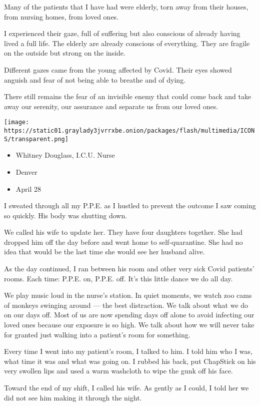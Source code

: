 Many of the patients that I have had were elderly, torn away from their
houses, from nursing homes, from loved ones.

I experienced their gaze, full of suffering but also conscious of
already having lived a full life. The elderly are already conscious of
everything. They are fragile on the outside but strong on the inside.

Different gazes came from the young affected by Covid. Their eyes showed
anguish and fear of not being able to breathe and of dying.

There still remains the fear of an invisible enemy that could come back
and take away our serenity, our assurance and separate us from our loved
ones.

\texttt{[image: https://static01.graylady3jvrrxbe.onion/packages/flash/multimedia/ICONS/transparent.png]}

\begin{itemize}
\tightlist
\item
  Whitney Douglass, I.C.U. Nurse
\item
  Denver
\item
  April 28
\end{itemize}

I sweated through all my P.P.E. as I hustled to prevent the outcome I
saw coming so quickly. His body was shutting down.

We called his wife to update her. They have four daughters together. She
had dropped him off the day before and went home to self-quarantine. She
had no idea that would be the last time she would see her husband alive.

As the day continued, I ran between his room and other very sick Covid
patients' rooms. Each time: P.P.E. on, P.P.E. off. It's this little
dance we do all day.

We play music loud in the nurse's station. In quiet moments, we watch
zoo cams of monkeys swinging around --- the best distraction. We talk
about what we do on our days off. Most of us are now spending days off
alone to avoid infecting our loved ones because our exposure is so high.
We talk about how we will never take for granted just walking into a
patient's room for something.

Every time I went into my patient's room, I talked to him. I told him
who I was, what time it was and what was going on. I rubbed his back,
put ChapStick on his very swollen lips and used a warm washcloth to wipe
the gunk off his face.

Toward the end of my shift, I called his wife. As gently as I could, I
told her we did not see him making it through the night.

